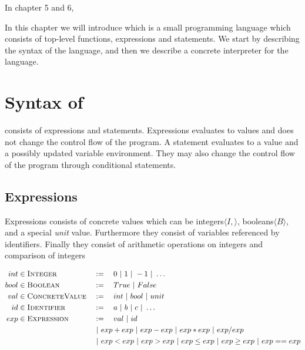 
In chapter 5 and 6,

\iffalse
 we want to demonstrate the differences between concrete and symbolic execution. To do so we have designed a small programming language called \explanguage, and implemented a concrete and a symbolic interpreter for the language. We have decided to make a purely functional implementation of both, 
 \fi

In this chapter we will introduce \explanguage which is a small programming language which consists of top-level functions, expressions and statements. We start by describing the syntax of the language, and then we describe a concrete interpreter for the language.

\section{Syntax of \explanguage}

\explanguage consists of expressions and statements. Expressions evaluates to values and does not change the control flow of the program. A statement evaluates to a value and a possibly updated variable environment. They may also change the control flow of the program through conditional statements.
 

\subsection{Expressions}


Expressions consists of concrete values which can be integers$\langle I, \rangle$, booleans$\langle B \rangle$, and a special \textsl{unit} value. Furthermore they consist of variables referenced by identifiers. Finally they consist of arithmetic operations on integers and comparison of integers 

\begin{alignat*}{3}
	int & \in \textsc{Integer} && := \quad 0 \ | \  1 \ | \  -1 \ | \  \ldots\\
	bool & \in \textsc{Boolean} && := \quad True \ | \  False\\
	val & \in \textsc{ConcreteValue} && := \quad int \ | \  bool \ | \  unit\\
	id & \in \textsc{Identifier} && := \quad a \ | \  b \ | \  c \ | \  \ldots \\
	exp & \in \textsc{Expression} && := \quad val \ | \  id\\ & && \ | \  exp + exp \ | \  exp - exp \ | \  exp * exp \ | \  exp / exp\\
	& && \ | \  exp < exp \ | \  exp > exp \ | \  exp \leq exp \ | \  exp \geq exp \ | \  exp == exp
\end{alignat*}


